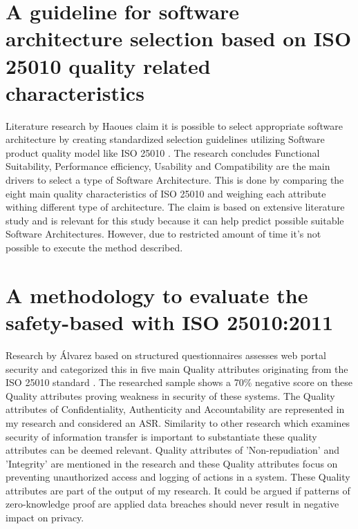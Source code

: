 \section{A guideline for software architecture selection based on ISO 25010 quality related characteristics}
Literature research by Haoues \etal \cite{Haoues2017AGF} claim it is possible to select appropriate software architecture by creating standardized selection guidelines utilizing Software product quality model like ISO 25010 \cite{ISO:25010:2011}. The research concludes Functional Suitability, Performance efficiency, Usability and Compatibility are the main drivers to select a type of Software Architecture. This is done by comparing the eight main quality characteristics of ISO 25010 and weighing each attribute withing different type of architecture. The claim is based on extensive literature study and is relevant for this study because it can help predict possible suitable Software Architectures. However, due to restricted amount of time it's not possible to execute the method described. 

\section{A methodology to evaluate the safety-based with ISO 25010:2011}
Research by {\'A}lvarez \etal \cite{Mexlvarez2021AMT} based on structured questionnaires assesses web portal security and categorized this in five main Quality attributes originating from the ISO 25010 standard \cite{ISO:25010:2011}. The researched sample shows a 70\% negative score on these Quality attributes proving weakness in security of these systems. The Quality attributes of Confidentiality, Authenticity and Accountability are represented in my research and considered an ASR. Similarity to other research which examines security of information transfer is important to substantiate these quality attributes can be deemed relevant. Quality attributes of 'Non-repudiation' and 'Integrity' are mentioned in the research and these Quality attributes focus on preventing unauthorized access and logging of actions in a system. These Quality attributes are part of the output of my research. It could be argued if patterns of zero-knowledge proof are applied data breaches should never result in negative impact on privacy.